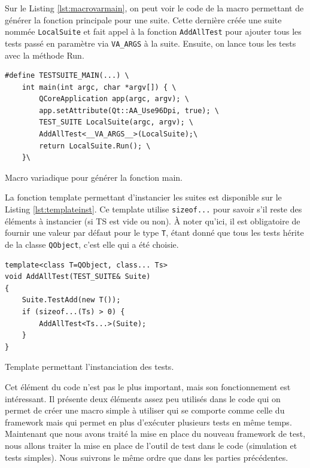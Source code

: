 \documentclass[a4paper]{article}
\begin{document}
Sur le Listing \ref{lst:macrovarmain}, on peut voir le code de la macro
permettant de générer la fonction principale pour une suite. Cette dernière créée
une suite nommée \verb|LocalSuite| et fait appel à la fonction \verb|AddAllTest|
pour ajouter tous les tests passé en paramètre via \verb|VA_ARGS| à la suite.
Ensuite, on lance tous les tests avec la méthode Run.

\begin{listing}[ht!]
\begin{verbatim}
#define TESTSUITE_MAIN(...) \
    int main(int argc, char *argv[]) { \
        QCoreApplication app(argc, argv); \
        app.setAttribute(Qt::AA_Use96Dpi, true); \
        TEST_SUITE LocalSuite(argc, argv); \
        AddAllTest<__VA_ARGS__>(LocalSuite);\
        return LocalSuite.Run(); \
    }\
\end{verbatim}
\caption{Macro variadique pour générer la fonction main.}
\label{lst:macrovarmain}
\end{listing}

La fonction template permettant d'instancier les suites est disponible sur le
Listing \ref{lst:templateinst}. Ce template utilise \verb|sizeof...| pour savoir
s'il reste des éléments à instancier (si TS est vide ou non). À noter qu'ici, il
est obligatoire de fournir une valeur par défaut pour le type \verb|T|, étant
donné que tous les tests hérite de la classe \verb|QObject|, c'est elle qui a
été choisie.

\begin{listing}[ht!]
\begin{verbatim}
template<class T=QObject, class... Ts>
void AddAllTest(TEST_SUITE& Suite)
{
    Suite.TestAdd(new T());
    if (sizeof...(Ts) > 0) {
        AddAllTest<Ts...>(Suite);
    }
}
\end{verbatim}
\caption{Template permettant l'instanciation des tests.}
\label{lst:templateinst}
\end{listing}

Cet élément du code n'est pas le plus important, mais son fonctionnement est
intéressant. Il présente deux éléments assez peu utilisés dans le code qui on
permet de créer une macro simple à utiliser qui se comporte comme celle du
framework mais qui permet en plus d'exécuter plusieurs tests en même temps. \\

Maintenant que nous avons traité la mise en place du nouveau framework de test,
nous allons traiter la mise en place de l'outil de test dans le code (simulation
et tests simples). Nous suivrons le même ordre que dans les parties précédentes.
\end{document}
